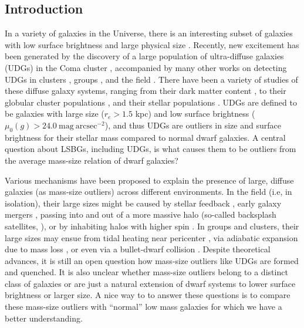 \documentclass[twocolumn,astrosymb,twocolappendix]{aastex631}
\newcommand{\sbunit}{\mathrm{mag\ arcsec}^{-2}}
\newcommand{\sbcen}{\mu_{0}(g)}
\begin{document}
\begin{CJK*}{UTF8}{gbsn}
\section{Introduction} \label{sec:intro}
In a variety of galaxies in the Universe, there is an interesting subset of galaxies with low surface brightness and large physical size \citep[dubbed low surface brightness galaxies or LSBGs, e.g.,][]{Sandage1984,Caldwell1987,Impey1988,McGaugh1995,Dalcanton1997a}. Recently, new excitement has been generated by the discovery of a large population of ultra-diffuse galaxies (UDGs) in the Coma cluster \citep{vanDokkum2015}, accompanied by many other works on detecting UDGs in clusters \citep[e.g.,][]{Koda2015,Mihos2015,Yagi2016,vdBurg2016,vdBurg2017,Lee2017,ManceraPina2018,Zaritsky2019}, groups \citep[e.g.,][]{Roman2017b,Greco2018,SAGA-II,CarlstenELVES2022}, and the field \citep[e.g.,][]{Leisman2017,Roman2019,Prole2019,Tanoglidis2021,Kadowaki2021}. There have been a variety of studies of these diffuse galaxy systems, ranging from their dark matter content \citep[e.g.,][]{Mowla2017,vanDokkum2018,vanDokkum2019,Wasserman2019,Keim2022}, to their globular cluster populations \citep[e.g.,][]{vanDokkum2017,Somalwar2020,Forbes2020,Danieli2022,Gannon2022,vanDokkum2022GC}, and their stellar populations \citep[e.g.,][]{Gu2018,Ferre-Mateu2018,Villaume2022}. UDGs are defined to be galaxies with large size ($r_e > 1.5$ kpc) and low surface brightness ($\sbcen > 24.0\ \sbunit$), and thus UDGs are outliers in size and surface brightness for their stellar mass compared to normal dwarf galaxies. A central question about LSBGs, including UDGs, is what causes them to be outliers from the average mass-size relation of dwarf galaxies?

Various mechanisms have been proposed to explain the presence of large, diffuse galaxies (as mass-size outliers) across different environments. In the field (i.e, in isolation), their large sizes might be caused by stellar feedback \citep{DiCintio2017,Chan2018}, early galaxy mergers \citep{Wright2021}, passing into and out of a more massive halo (so-called backsplash satellites, \citealt{Benavides2021}), or by inhabiting halos with higher spin \citep{Dalcanton1997,Amorisco2016,Liao2019,Benavides2022}. In groups and clusters, their large sizes may ensue from tidal heating near pericenter \citep{Jiang2019}, via adiabatic expansion due to mass loss \citep{Tremmel2020}, or even via a bullet-dwarf collision \citep{vandokkum2022Nat,vanDokkum2022GC}. Despite theoretical advances, it is still an open question how mass-size outliers like UDGs are formed and quenched. It is also unclear whether mass-size outliers belong to a distinct class of galaxies or are just a natural extension of dwarf systems to lower surface brightness or larger size. A nice way to to answer these questions is to compare these mass-size outliers with ``normal'' low mass galaxies for which we have a better understanding. 



\end{CJK*}
\end{document}
